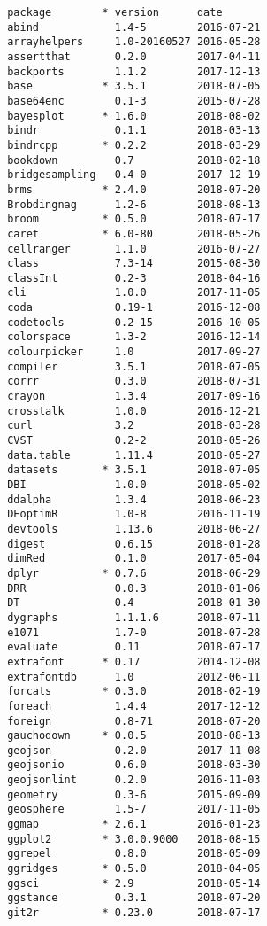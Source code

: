 \documentclass[twoside,12pt,final]{ucthesis-CA2012}
\begin{document}
\begin{ucmainmatter}
\begin{verbatim}
 package        * version      date      
 abind            1.4-5        2016-07-21
 arrayhelpers     1.0-20160527 2016-05-28
 assertthat       0.2.0        2017-04-11
 backports        1.1.2        2017-12-13
 base           * 3.5.1        2018-07-05
 base64enc        0.1-3        2015-07-28
 bayesplot      * 1.6.0        2018-08-02
 bindr            0.1.1        2018-03-13
 bindrcpp       * 0.2.2        2018-03-29
 bookdown         0.7          2018-02-18
 bridgesampling   0.4-0        2017-12-19
 brms           * 2.4.0        2018-07-20
 Brobdingnag      1.2-6        2018-08-13
 broom          * 0.5.0        2018-07-17
 caret          * 6.0-80       2018-05-26
 cellranger       1.1.0        2016-07-27
 class            7.3-14       2015-08-30
 classInt         0.2-3        2018-04-16
 cli              1.0.0        2017-11-05
 coda             0.19-1       2016-12-08
 codetools        0.2-15       2016-10-05
 colorspace       1.3-2        2016-12-14
 colourpicker     1.0          2017-09-27
 compiler         3.5.1        2018-07-05
 corrr            0.3.0        2018-07-31
 crayon           1.3.4        2017-09-16
 crosstalk        1.0.0        2016-12-21
 curl             3.2          2018-03-28
 CVST             0.2-2        2018-05-26
 data.table       1.11.4       2018-05-27
 datasets       * 3.5.1        2018-07-05
 DBI              1.0.0        2018-05-02
 ddalpha          1.3.4        2018-06-23
 DEoptimR         1.0-8        2016-11-19
 devtools         1.13.6       2018-06-27
 digest           0.6.15       2018-01-28
 dimRed           0.1.0        2017-05-04
 dplyr          * 0.7.6        2018-06-29
 DRR              0.0.3        2018-01-06
 DT               0.4          2018-01-30
 dygraphs         1.1.1.6      2018-07-11
 e1071            1.7-0        2018-07-28
 evaluate         0.11         2018-07-17
 extrafont      * 0.17         2014-12-08
 extrafontdb      1.0          2012-06-11
 forcats        * 0.3.0        2018-02-19
 foreach          1.4.4        2017-12-12
 foreign          0.8-71       2018-07-20
 gauchodown     * 0.0.5        2018-08-13
 geojson          0.2.0        2017-11-08
 geojsonio        0.6.0        2018-03-30
 geojsonlint      0.2.0        2016-11-03
 geometry         0.3-6        2015-09-09
 geosphere        1.5-7        2017-11-05
 ggmap          * 2.6.1        2016-01-23
 ggplot2        * 3.0.0.9000   2018-08-15
 ggrepel          0.8.0        2018-05-09
 ggridges       * 0.5.0        2018-04-05
 ggsci          * 2.9          2018-05-14
 ggstance         0.3.1        2018-07-20
 git2r          * 0.23.0       2018-07-17

\end{verbatim}
\end{ucmainmatter}
\end{document}
